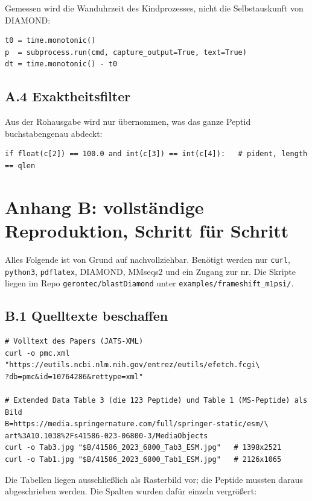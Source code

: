 \documentclass[11pt,a4paper]{article}
\begin{document}
Gemessen wird die Wanduhrzeit des Kindprozesses, nicht die Selbstauskunft von
DIAMOND:

\begin{lstlisting}
t0 = time.monotonic()
p  = subprocess.run(cmd, capture_output=True, text=True)
dt = time.monotonic() - t0
\end{lstlisting}

\subsection*{A.4 Exaktheitsfilter}

Aus der Rohausgabe wird nur übernommen, was das ganze Peptid buchstabengenau
abdeckt:

\begin{lstlisting}
if float(c[2]) == 100.0 and int(c[3]) == int(c[4]):   # pident, length == qlen
\end{lstlisting}

\section{Anhang B: vollständige Reproduktion, Schritt für Schritt}

Alles Folgende ist von Grund auf nachvollziehbar. Benötigt werden nur
\texttt{curl}, \texttt{python3}, \texttt{pdflatex}, DIAMOND, MMseqs2 und ein
Zugang zur nr. Die Skripte liegen im Repo \texttt{gerontec/blastDiamond} unter
\texttt{examples/frameshift\_m1psi/}.

\subsection*{B.1 Quelltexte beschaffen}

\begin{lstlisting}
# Volltext des Papers (JATS-XML)
curl -o pmc.xml "https://eutils.ncbi.nlm.nih.gov/entrez/eutils/efetch.fcgi\
?db=pmc&id=10764286&rettype=xml"

# Extended Data Table 3 (die 123 Peptide) und Table 1 (MS-Peptide) als Bild
B=https://media.springernature.com/full/springer-static/esm/\
art%3A10.1038%2Fs41586-023-06800-3/MediaObjects
curl -o Tab3.jpg "$B/41586_2023_6800_Tab3_ESM.jpg"   # 1398x2521
curl -o Tab1.jpg "$B/41586_2023_6800_Tab1_ESM.jpg"   # 2126x1065
\end{lstlisting}

Die Tabellen liegen ausschließlich als Rasterbild vor; die Peptide mussten
daraus abgeschrieben werden. Die Spalten wurden dafür einzeln vergrößert:
\end{document}
